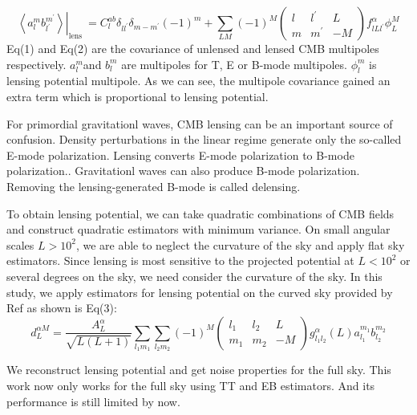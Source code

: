 \documentclass[12pt, notitlepage, onecolumn, amsmath, amssymb, aps]{revtex4-1}
\begin{document}
\begin{equation}
  \left.\left\langle a_{l}^{m} b_{l^{\prime}}^{m^{\prime}}\right\rangle\right|_{\text {lens }}=C_{l}^{a b} \delta_{l l^{\prime}} \delta_{m-m^{\prime}}(-1)^{m}+\sum_{L M}(-1)^{M}\left(\begin{array}{ccc}
{l} & {l^{\prime}} & {L} \\
{m} & {m^{\prime}} & {-M}
\end{array}\right) f_{l L l^{\prime}}^{\alpha} \phi_{L}^{M}
\end{equation}
Eq(1) and Eq(2) are the covariance of unlensed and lensed CMB multipoles respectively. \(a_{l}^{m} \)and \(b_{l}^{m} \)  are multipoles for T, E or B-mode multipoles. \(\phi_{l}^{m}\) is lensing potential multipole. As we can see, the multipole covariance gained an extra term which is proportional to lensing potential. 

For primordial gravitationl waves, CMB lensing can be an important source of confusion\cite{Lewis:2006fu}. Density perturbations in the linear regime generate only the so-called E-mode polarization\cite{Kamionkowski:1996ks}. Lensing converts E-mode polarization to B-mode polarization.\cite{Zaldarriaga:1998ar}. Gravitationl waves can also produce B-mode polarization\cite{Hu:2000ee}. Removing the lensing-generated B-mode is called delensing.

To obtain lensing potential, we can take quadratic combinations of CMB fields and construct quadratic estimators with minimum variance\cite{Hu:2000ee}. On small angular scales \(L>10^2\), we are able to neglect the curvature of the sky and apply flat sky estimators\cite{Hu:2001kj}. Since lensing is most sensitive to the projected potential at \(L<10^2\) or several degrees on the sky, we need consider the curvature of the sky. In this study, we apply estimators for lensing potential on the curved sky provided by Ref\cite{Okamoto:2003zw} as shown is Eq(3):
\begin{equation}
  d_{L}^{\alpha M}=\frac{A_{L}^{\alpha}}{\sqrt{L(L+1)}} \sum_{l_{1} m_{1}} \sum_{l_{2} m_{2}}(-1)^{M}\left(\begin{array}{ccc}
{l_{1}} & {l_{2}} & {L} \\
{m_{1}} & {m_{2}} & {-M}
\end{array}\right) g_{l_{1} l_{2}}^{\alpha}(L) a_{l_{1}}^{m_{1}} b_{l_{2}}^{m_{2}}
\end{equation}


We reconstruct lensing potential and get noise properties for the full sky. This work now only works for the full sky using TT and EB estimators. And its performance is still limited by now. 
\end{document}
